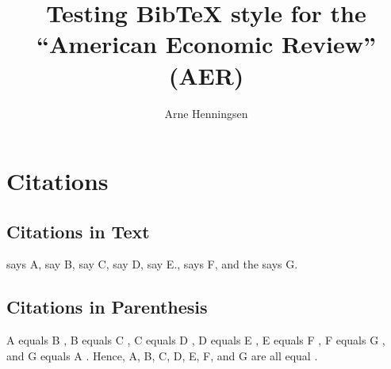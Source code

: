 \documentclass{scrartcl}
\title{Testing Bib\TeX{} style for the
   ``American Economic Review'' (AER)}
\author{Arne Henningsen}
\begin{document}
\maketitle

\section{Citations}
\subsection{Citations in Text}
\citet{Black29} says A, \citet{Wold89} say B, \citet{Wold} say C,
\citet{Wold4} say D, \citet{Wold5} say E., \citet{Brown65} says F,
and the \citet{USDA65} says G.

\subsection{Citations in Parenthesis}
A equals B \citep{Black29}, B equals C \citep{Wold89}, C equals D \citep{Wold},
D equals E \citep{Wold4}, E equals F \citep{Wold5}, F equals G \citep{Brown65},
and G equals A \citep{USDA65}.
Hence, A, B, C, D, E, F, and G are all equal
\citep{Black29, Wold89, Wold, Wold4, Wold5, Brown65, USDA65}.

\nocite{*}


\end{document}
